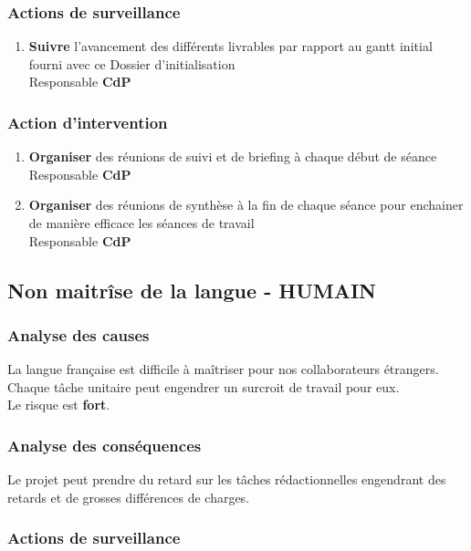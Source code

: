 \subsubsection{Actions de surveillance}

\begin{enumerate}
\item {\bf Suivre} l'avancement des différents livrables par rapport au gantt initial fourni avec ce Dossier d'initialisation \\ Responsable {\bf CdP}
\end{enumerate}

\subsubsection{Action d'intervention}

\begin{enumerate}
\item {\bf Organiser} des réunions de suivi et de briefing à chaque début de séance \\ Responsable {\bf CdP}
\item {\bf Organiser} des réunions de synthèse à la fin de chaque séance pour enchainer de manière efficace les séances de travail \\ Responsable {\bf CdP}
\end{enumerate}

\subsection{Non maitrîse de la langue - HUMAIN}
\subsubsection{Analyse des causes}

La langue française est difficile à maîtriser pour nos collaborateurs étrangers. Chaque tâche unitaire peut engendrer un surcroit de travail pour eux. \\
Le risque est {\bf fort}.

\subsubsection{Analyse des conséquences}

Le projet peut prendre du retard sur les tâches rédactionnelles engendrant des retards et de grosses différences de charges.

\subsubsection{Actions de surveillance}

